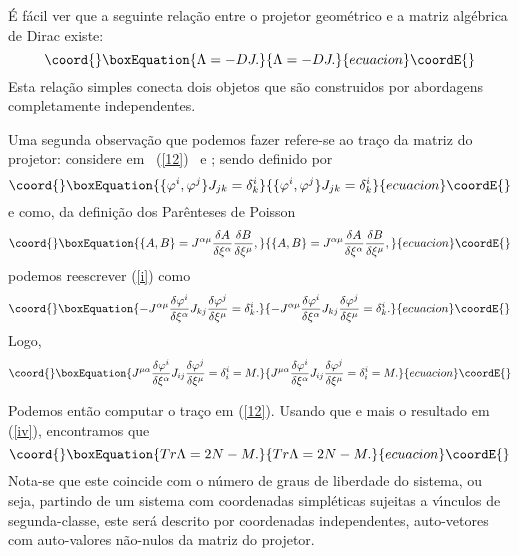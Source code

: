 \documentclass[a4paper,thmsa,12pt]{report}
\begin{document}
\'{E} f\'{a}cil ver que a seguinte rela\c{c}\~{a}o entre o projetor
geom\'{e}trico e a matriz alg\'{e}brica de Dirac existe: 
\begin{equation}\coord{}\boxEquation{
\Lambda =-DJ.  \label{m11}
}{
\Lambda =-DJ.  }{ecuacion}\coordE{}\end{equation}
Esta rela\c{c}\~{a}o simples conecta dois objetos que s\~{a}o construidos
por abordagens completamente independentes.

Uma segunda observa\c{c}\~{a}o que podemos fazer refere-se ao tra\c{c}o da
matriz do projetor: considere em \ (\ref{12}) \coordHE{} \ e \coordHE{};
sendo \coordHE{} definido por 
\begin{equation}\coord{}\boxEquation{
\{\varphi ^{i},\varphi ^{j}\}J_{jk}=\delta _{k}^{i}  \label{i}
}{
\{\varphi ^{i},\varphi ^{j}\}J_{jk}=\delta _{k}^{i}  }{ecuacion}\coordE{}\end{equation}
e como, da defini\c{c}\~{a}o dos Par\^{e}nteses de Poisson 
\begin{equation}\coord{}\boxEquation{
\{A,B\}=J^{\alpha \mu }\frac{\delta A}{\delta \xi ^{\alpha }}\frac{\delta B}{
\delta \xi ^{\mu }},  \label{ii}
}{
\{A,B\}=J^{\alpha \mu }\frac{\delta A}{\delta \xi ^{\alpha }}\frac{\delta B}{
\delta \xi ^{\mu }},  }{ecuacion}\coordE{}\end{equation}
podemos reescrever (\ref{i}) como 
\begin{equation}\coord{}\boxEquation{
-J^{\alpha \mu }\frac{\delta \varphi ^{i}}{\delta \xi ^{\alpha }}J_{kj}\frac{
\delta \varphi ^{j}}{\delta \xi ^{\mu }}=\delta _{k}^{i}.  \label{iii}
}{
-J^{\alpha \mu }\frac{\delta \varphi ^{i}}{\delta \xi ^{\alpha }}J_{kj}\frac{
\delta \varphi ^{j}}{\delta \xi ^{\mu }}=\delta _{k}^{i}.  }{ecuacion}\coordE{}\end{equation}
Logo, 
\begin{equation}\coord{}\boxEquation{
J^{\mu \alpha }\frac{\delta \varphi ^{i}}{\delta \xi ^{\alpha }}J_{ij}\frac{
\delta \varphi ^{j}}{\delta \xi ^{\mu }}=\delta _{i}^{i}=M.  \label{iv}
}{
J^{\mu \alpha }\frac{\delta \varphi ^{i}}{\delta \xi ^{\alpha }}J_{ij}\frac{
\delta \varphi ^{j}}{\delta \xi ^{\mu }}=\delta _{i}^{i}=M.  }{ecuacion}\coordE{}\end{equation}

Podemos ent\~{a}o computar o tra\c{c}o \myHighlight{$\Lambda ^{\mu \mu }$}\coordHE{} em (\ref{12}).
Usando que \coordHE{} e mais o resultado em (\ref{iv}),
encontramos que 
\begin{equation}\coord{}\boxEquation{
Tr\Lambda =2N-M.  \label{v}
}{
Tr\Lambda =2N-M.  }{ecuacion}\coordE{}\end{equation}
Nota-se que este coincide com o n\'{u}mero de graus de liberdade do sistema,
ou seja, partindo de um sistema com \coordHE{} coordenadas simpl\'{e}ticas sujeitas
a \coordHE{} v\'{\i}nculos de segunda-classe, este ser\'{a} descrito por \coordHE{}
coordenadas independentes, auto-vetores com auto-valores n\~{a}o-nulos da
matriz do projetor.
\end{document}
